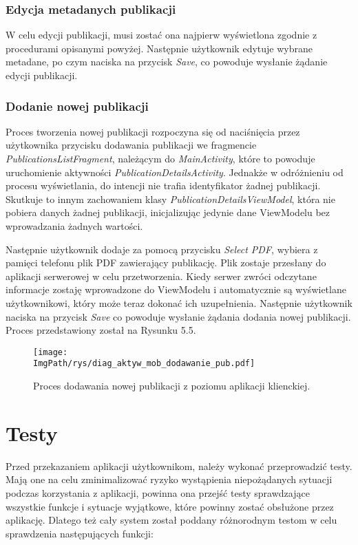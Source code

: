 \documentclass[a4paper,12pt,twoside,openany]{report}
\newcommand{\ImgPath}{.}
\begin{document}
\subsection{Edycja metadanych publikacji}
W celu edycji publikacji, musi zostać ona najpierw wyświetlona zgodnie z procedurami opisanymi powyżej. Następnie użytkownik edytuje wybrane metadane, po czym naciska na przycisk \textit{Save}, co powoduje wysłanie żądanie edycji publikacji.

\subsection{Dodanie nowej publikacji}
Proces tworzenia nowej publikacji rozpoczyna się od naciśnięcia przez użytkownika przycisku dodawania publikacji we fragmencie \textit{PublicationsListFragment}, należącym do \textit{MainActivity}, które to powoduje uruchomienie aktywności \textit{PublicationDetailsActivity}. Jednakże w odróżnieniu od procesu wyświetlania, do intencji nie trafia identyfikator żadnej publikacji. Skutkuje to innym zachowaniem klasy \textit{PublicationDetailsViewModel}, która nie pobiera danych żadnej publikacji, inicjalizując jedynie dane ViewModelu bez wprowadzania żadnych wartości. 

Następnie użytkownik dodaje za pomocą przycisku \textit{Select PDF}, wybiera z pamięci telefonu plik PDF zawierający publikację. Plik zostaje przesłany do aplikacji serwerowej w celu przetworzenia. Kiedy serwer zwróci odczytane informacje zostaję wprowadzone do ViewModelu i automatycznie są wyświetlane użytkownikowi, który może teraz dokonać ich uzupełnienia. Następnie użytkownik naciska na przycisk \textit{Save} co powoduje wysłanie żądania dodania nowej publikacji. Proces przedstawiony został na Rysunku 5.5.

\begin{figure}[!htbp]
	\begin{center}
		\centering
		\texttt{[image: \\ImgPath/rys/diag\_aktyw\_mob\_dodawanie\_pub.pdf]}
	\end{center}
	\caption{Proces dodawania nowej publikacji z poziomu aplikacji klienckiej.}
	\label{diagramAktywnosciMobDodEdyt}
\end{figure}



\chapter{Testy}
Przed przekazaniem aplikacji użytkownikom, należy wykonać przeprowadzić testy. Mają one na celu zminimalizować ryzyko wystąpienia niepożądanych sytuacji podczas korzystania z aplikacji, powinna ona przejść testy sprawdzające wszystkie funkcje i sytuacje wyjątkowe, które powinny zostać obsłużone przez aplikację. Dlatego też cały system został poddany różnorodnym testom w celu sprawdzenia następujących funkcji: 
\end{document}
